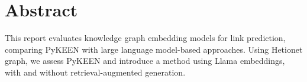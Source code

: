 \section*{Abstract}


This report evaluates knowledge graph embedding models for link prediction, comparing PyKEEN with large language model-based approaches. Using Hetionet graph, we assess PyKEEN and introduce a method using Llama embeddings, with and without retrieval-augmented generation.
